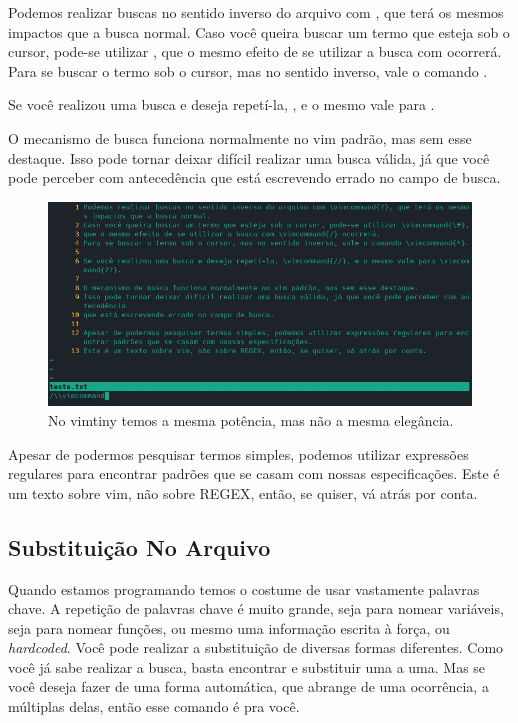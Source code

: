 Podemos realizar buscas no sentido inverso do arquivo com , que terá os mesmos impactos que a busca normal.
Caso você queira buscar um termo que esteja sob o cursor, pode-se utilizar \vimcommand{\#},
que o mesmo efeito de se utilizar a busca com \vimcommand{/} ocorrerá. 
Para se buscar o termo sob o cursor, mas no sentido inverso, vale o comando \vimcommand{*}.

Se você realizou uma busca e deseja repetí-la, \vimcommand{//}, e o mesmo vale para .

O mecanismo de busca funciona normalmente no vim padrão, mas sem esse destaque.
Isso pode tornar deixar difícil realizar uma busca válida, já que você pode perceber com antecedência
que está escrevendo errado no campo de busca.

\begin{figure}[!htb]
\centering
\includegraphics[scale=0.70]{recursos_avancados/Busca_No_Arquivo_vimtiny.jpg}
\caption{No vimtiny temos a mesma potência, mas não a mesma elegância.}
\end{figure}

Apesar de podermos pesquisar termos simples, podemos utilizar expressões regulares para encontrar padrões que se casam com nossas especificações.
Este é um texto sobre vim, não sobre REGEX, então, se quiser, vá atrás por conta.

\subsection{Substituição No Arquivo}
Quando estamos programando temos o costume de usar vastamente palavras chave.
A repetição de palavras chave é muito grande, seja para nomear variáveis, seja para nomear funções,
ou mesmo uma informação escrita à força, ou \textit{hardcoded}.
Você pode realizar a substituição de diversas formas diferentes.
Como você já sabe realizar a busca, basta encontrar e substituir uma a uma.
Mas se você deseja fazer de uma forma automática, que abrange de uma ocorrência, a múltiplas delas, então esse comando é pra você.

